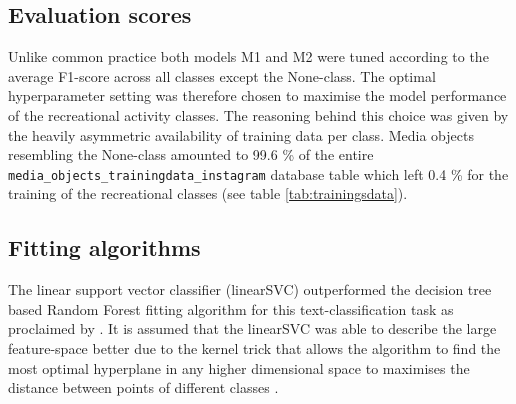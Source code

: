 \subsection{Evaluation scores}
Unlike common practice \parencite{Guido2016} both models M1 and M2 were tuned according to the average F1-score across all classes except the None-class. The optimal hyperparameter setting was therefore chosen to maximise the model performance of the recreational activity classes. The reasoning behind this choice was given by the heavily asymmetric availability of training data per class. Media objects resembling the None-class amounted to 99.6 \% of the entire \texttt{media\_objects\_trainingdata\_instagram} database table which left 0.4 \% for the training of the recreational classes (see table \ref{tab:trainingsdata}).

\subsection{Fitting algorithms}
The linear support vector classifier (linearSVC) outperformed the decision tree based Random Forest fitting algorithm for this text-classification task as proclaimed by \parencite{Guido2016}. It is assumed that the linearSVC was able to describe the large feature-space better due to the kernel trick that allows the algorithm to find the most optimal hyperplane in any higher dimensional space to maximises the distance between points of different classes \parencite{Shawe-Taylor2004}.

